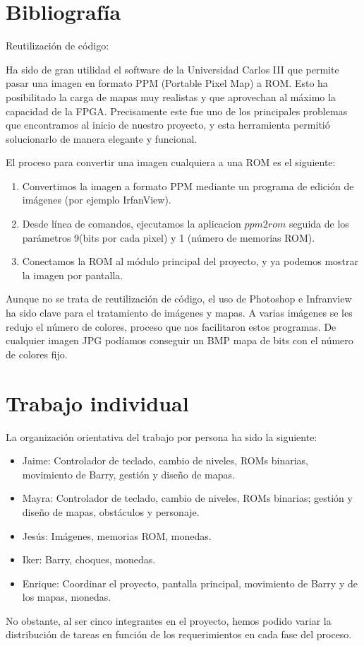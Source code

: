 \documentclass[11pt, a4paper, spanish, openright, twoside]{book}
\begin{document}
\section{Bibliografía}
Reutilización de código:

Ha sido de gran utilidad el software de la Universidad Carlos III que permite pasar una imagen en formato PPM (Portable Pixel Map) a ROM. Esto ha posibilitado la carga de mapas muy realistas y que aprovechan al máximo la capacidad de la FPGA.
Precisamente este fue uno de los principales problemas que encontramos al inicio de nuestro proyecto, y esta herramienta permitió solucionarlo de manera elegante y funcional. 

El proceso para convertir una imagen cualquiera a una ROM es el siguiente:
\begin{enumerate}
\item Convertimos la imagen a formato PPM mediante un programa de edición de imágenes (por ejemplo IrfanView).
\item Desde línea de comandos, ejecutamos la aplicacion $ppm2rom$ seguida de los parámetros 9(bits por cada pixel) y 1 (número de memorias ROM).
\item Conectamos la ROM al módulo principal del proyecto, y ya podemos mostrar la imagen por pantalla.
\end{enumerate}

Aunque no se trata de reutilización de código, el uso de Photoshop  e Infranview ha sido clave para el tratamiento de imágenes y mapas. A varias imágenes se les redujo el número de colores, proceso que nos facilitaron estos programas. De cualquier imagen JPG podíamos conseguir un BMP mapa de bits con el número de colores fijo.




\section{Trabajo individual}
La organización orientativa del trabajo por persona ha sido la siguiente:
\begin{itemize}
\item Jaime: Controlador de teclado, cambio de niveles, ROMs binarias, movimiento de Barry, gestión y diseño de mapas.
\item Mayra: Controlador de teclado,  cambio de niveles, ROMs binarias; gestión y diseño de mapas, obstáculos y personaje.
\item Jesús: Imágenes, memorias ROM, monedas.
\item Iker: Barry, choques, monedas.
\item Enrique: Coordinar el proyecto, pantalla principal, movimiento de Barry y de los mapas, monedas.
\end{itemize}
No obstante, al ser cinco integrantes en el proyecto, hemos podido variar la distribución de tareas en función de los requerimientos en cada fase del proceso. 
\end{document}
